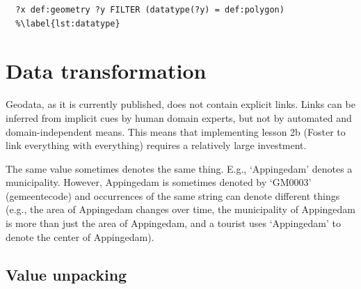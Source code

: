 \documentclass[a4paper]{scrartcl}
\begin{document}
\begin{verbatim}
  ?x def:geometry ?y FILTER (datatype(?y) = def:polygon)
  %\label{lst:datatype}
\end{verbatim}

\section{Data transformation}
\label{sec:conversion}
\label{sec:enrichment}
\label{sec:transformation}

Geodata, as it is currently published, does not contain explicit
links.  Links can be inferred from implicit cues by human domain
experts, but not by automated and domain-independent means.  This
means that implementing lesson 2b (Foster to link everything with
everything) requires a relatively large investment.

The same value sometimes denotes the same thing.  E.g., `Appingedam'
denotes a municipality.  However, Appingedam is sometimes denoted by
`GM0003' (gemeentecode) and occurrences of the same string can denote
different things (e.g., the area of Appingedam changes over time, the
municipality of Appingedam is more than just the area of Appingedam,
and a tourist uses `Appingedam' to denote the center of Appingedam).



\subsection{Value unpacking}
\label{sec:grammar}
\end{document}

